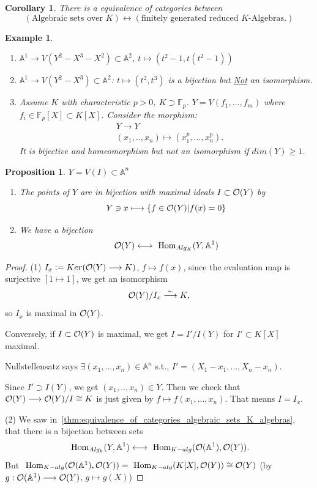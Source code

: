 \documentclass[11pt]{article}
\newtheorem{prop}[thm]{Proposition}
\newtheorem{cor}[thm]{Corollary}
\newtheorem{ex}[thm]{Example}
\renewcommand{\hom}{\text{ Hom}}
\newcommand{\affn}{\mathbb A}
\newcommand{\calo}{{\cal O}}
\newcommand{\lrta}{\longrightarrow}
\newcommand{\llrta}{\longleftrightarrow}
\begin{document}
\begin{cor}
There is a equivalence of categories between 
$$
(\text{Algebraic sets over $K$})\llrta (\text{finitely generated reduced } K\text{-Algebras}.)
$$
\end{cor}

\begin{ex}\ 
\begin{enumerate}[label=(\arabic*)]
\item $\affn^1\lrta V(Y^2-X^3-X^2)\subset \affn^2$, $t\mapsto (t^2-1,t(t^2-1))$
\item $\affn^1\lrta V(Y^2-X^3)\subset \affn^2$: $t\longmapsto (t^2,t^3)$ is a bijection but \underline{Not} an isomorphism.
\item Assume $K$ with characteristic $p>0$, $K\supset \mathbb{F}_p$. $Y=V(f_1,...,f_m)$ where $f_i\in \mathbb{F}_p[X]\subset K[X]$. Consider the morphism:
$$
\begin{aligned}
&Y\lrta Y\\
& (x_1,..,x_n)\longmapsto (x_1^p,...,x_n^p).
\end{aligned}
$$
It is bijective and homeomorphism but not an isomorphism if $dim(Y)\geq 1$.
\end{enumerate}
\end{ex}
\begin{prop}
$Y=V(I)\subset \affn^n$
\begin{enumerate}[label=(\arabic*)]
\item The points of $Y$ are in bijection with maximal ideals $I\subset \calo(Y)$ by 
$$
Y\ni x\longmapsto \{f\in \calo(Y)|f(x)=0\}
$$
\item We have a bijection 
$$
\calo(Y)\llrta \hom_{Alg_K}(Y,\affn^1)
$$
\end{enumerate}
\end{prop}
\begin{proof}
(1) $I_x:=Ker(\calo(Y)\lrta K)$, $f\mapsto f(x)$, since the evaluation map is surjective $[1\mapsto 1]$, we get an isomorphism 
$$
\calo(Y)/I_x\overset{\sim}{\lrta} K,
$$
so $I_x$ is maximal in $\calo(Y)$.

Conversely, if $I\subset \calo(Y)$ is maximal, we get $I=I'/I(Y)$ for $I'\subset K[X]$ maximal. 

Nullstellensatz says $\exists (x_1,...,x_n)\in\affn^n$ s.t., $I'=(X_1-x_1,...,X_n-x_n)$. 

Since $I'\supset I(Y)$, we get $(x_1,..,x_n)\in Y$. Then we check that $\calo(Y)\lrta\calo(Y)/I\cong K$ is just given by $f\mapsto f(x_1,...,x_n)$. That means $I=I_x$.

(2) We saw in~\ref{thm:equivalence_of_categories_algebraic_sets_K_algebras}, that there is a bijection between sets
$$
\hom_{Alg_k}(Y,\affn^1)\llrta \hom_{K-alg}(\calo(\affn^1),\calo(Y)).
$$
But $\hom_{K-alg}(\calo(\affn^1),\calo(Y))=\hom_{K-alg}(K[X],\calo(Y))\cong \calo(Y)$ (by $g:\calo(\affn^1)\lrta \calo(Y)$, $g\mapsto g(X)$)
\end{proof}
\end{document}
